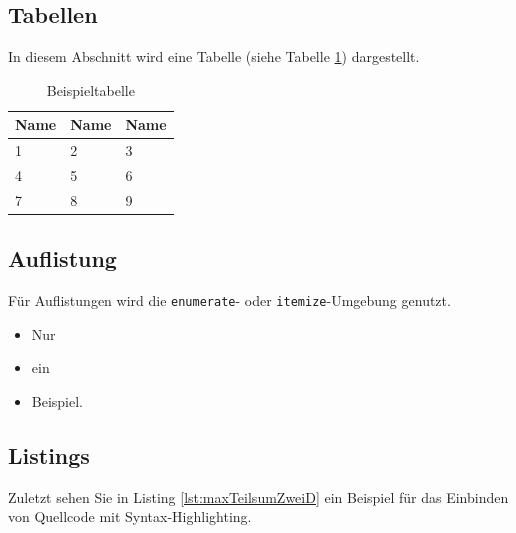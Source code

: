 \documentclass[12pt,a4paper,bibliography=totocnumbered,listof=totocnumbered]{scrartcl}
\begin{document}

\subsection{Tabellen}
In diesem Abschnitt wird eine Tabelle (siehe Tabelle \ref{tab:beispiel}) dargestellt.

\vspace{1em}
\begin{table}[!h]
	\centering
	\begin{tabular}{|l|l|l|}
		\hline
		\textbf{Name} & \textbf{Name} & \textbf{Name}\\
		\hline
		1 & 2 & 3\\
		\hline
		4 & 5 & 6\\
		\hline
		7 & 8 & 9\\
		\hline
	\end{tabular}
	\caption{Beispieltabelle}
	\label{tab:beispiel}
\end{table}


\subsection{Auflistung}
Für Auflistungen wird die \texttt{enumerate}- oder \texttt{itemize}-Umgebung genutzt.

\begin{itemize}
	\item Nur
	\item ein
	\item Beispiel.
\end{itemize}

\subsection{Listings}
Zuletzt sehen Sie in Listing \ref{lst:maxTeilsumZweiD} ein Beispiel für das Einbinden von Quellcode mit Syntax-Highlighting.

\vspace{1em}

\end{document}
